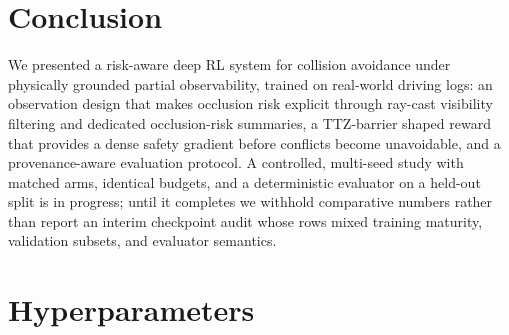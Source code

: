 \documentclass{article}
\begin{document}
\section{Conclusion}
\label{sec:conclusion}

We presented a risk-aware deep RL system for collision avoidance under
physically grounded partial observability, trained on real-world driving
logs: an
observation design that makes occlusion risk explicit through ray-cast
visibility filtering and dedicated occlusion-risk summaries, a TTZ-barrier
shaped reward that provides a dense safety gradient before conflicts become
unavoidable, and a provenance-aware evaluation protocol. A controlled,
multi-seed study with matched arms, identical budgets, and a deterministic
evaluator on a held-out split is in progress; until it completes we
withhold comparative numbers rather than report an interim checkpoint audit
whose rows mixed training maturity, validation subsets, and evaluator
semantics.




\appendix

\section{Hyperparameters}
\label{app:hyper}
\end{document}
